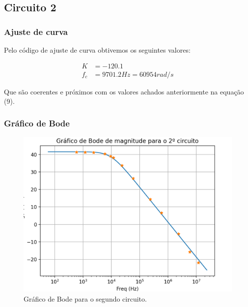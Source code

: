 \newpage
\subsection{Circuito 2}


\subsubsection{Ajuste de curva}


Pelo código de ajuste de curva obtivemos os seguintes valores:


\begin{equation}
    \begin{aligned}
        K   & = -120.1                   \\
        f_c & =  9701.2 Hz = 60954 rad/s
    \end{aligned}
\end{equation}


Que são coerentes e próximos com os valores achados anteriormente na equação (9).


\subsubsection{Gráfico de Bode}


\begin{figure}[H]
    \centering
    \includegraphics[width=1\columnwidth]{images/bode2.png}
    \caption{Gráfico de Bode para o segundo circuito.}
\end{figure}






